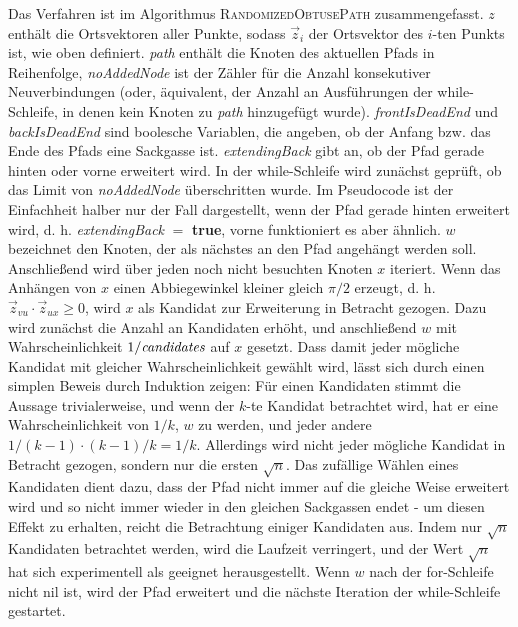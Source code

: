 \documentclass[a4paper, 10pt, ngerman]{article}
\begin{document}
Das Verfahren ist im Algorithmus \textsc{RandomizedObtusePath} zusammengefasst. $z$ enthält die Ortsvektoren aller Punkte, sodass $\vec z_i$ der Ortsvektor des $i$-ten Punkts ist, wie oben definiert. \emph{path} enthält die Knoten des aktuellen Pfads in Reihenfolge, \emph{noAddedNode} ist der Zähler für die Anzahl konsekutiver Neuverbindungen (oder, äquivalent, der Anzahl an Ausführungen der while-Schleife, in denen kein Knoten zu \emph{path} hinzugefügt wurde). \emph{frontIsDeadEnd} und \emph{backIsDeadEnd} sind boolesche Variablen, die angeben, ob der Anfang bzw. das Ende des Pfads eine Sackgasse ist. \emph{extendingBack} gibt an, ob der Pfad gerade hinten oder vorne erweitert wird. In der while-Schleife wird zunächst geprüft, ob das Limit von \emph{noAddedNode} überschritten wurde. Im Pseudocode ist der Einfachheit halber nur der Fall dargestellt, wenn der Pfad gerade hinten erweitert wird, d. h. \emph{extendingBack} $=$ \textbf{true}, vorne funktioniert es aber ähnlich. $w$ bezeichnet den Knoten, der als nächstes an den Pfad angehängt werden soll. Anschließend wird über jeden noch nicht besuchten Knoten $x$ iteriert. Wenn das Anhängen von $x$ einen Abbiegewinkel kleiner gleich $\pi / 2$ erzeugt, d. h. $\vec z_{vu} \cdot \vec z_{ux} \ge 0$, wird $x$ als Kandidat zur Erweiterung in Betracht gezogen. Dazu wird zunächst die Anzahl an Kandidaten erhöht, und anschließend $w$ mit Wahrscheinlichkeit $1 / \emph{candidates}$ auf $x$ gesetzt. Dass damit jeder mögliche Kandidat mit gleicher Wahrscheinlichkeit gewählt wird, lässt sich durch einen simplen Beweis durch Induktion zeigen: Für einen Kandidaten stimmt die Aussage trivialerweise, und wenn der $k$-te Kandidat betrachtet wird, hat er eine Wahrscheinlichkeit von $1/k$, $w$ zu werden, und jeder andere $1/(k-1) \cdot (k - 1) / k = 1 / k$. Allerdings wird nicht jeder mögliche Kandidat in Betracht gezogen, sondern nur die ersten $\sqrt n$. Das zufällige Wählen eines Kandidaten dient dazu, dass der Pfad nicht immer auf die gleiche Weise erweitert wird und so nicht immer wieder in den gleichen Sackgassen endet - um diesen Effekt zu erhalten, reicht die Betrachtung einiger Kandidaten aus. Indem nur $\sqrt n$ Kandidaten betrachtet werden, wird die Laufzeit verringert, und der Wert $\sqrt n$ hat sich experimentell als geeignet herausgestellt. Wenn $w$ nach der for-Schleife nicht nil ist, wird der Pfad erweitert und die nächste Iteration der while-Schleife gestartet. 
\end{document}
